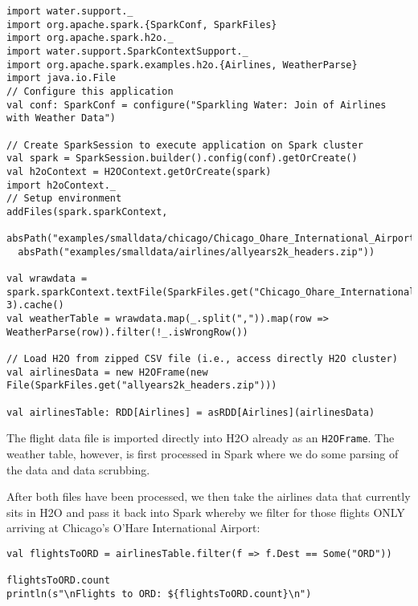 \begin{lstlisting}[style=Scala]
import water.support._
import org.apache.spark.{SparkConf, SparkFiles}
import org.apache.spark.h2o._
import water.support.SparkContextSupport._
import org.apache.spark.examples.h2o.{Airlines, WeatherParse}
import java.io.File
// Configure this application
val conf: SparkConf = configure("Sparkling Water: Join of Airlines with Weather Data")

// Create SparkSession to execute application on Spark cluster
val spark = SparkSession.builder().config(conf).getOrCreate()
val h2oContext = H2OContext.getOrCreate(spark)
import h2oContext._
// Setup environment
addFiles(spark.sparkContext,
  absPath("examples/smalldata/chicago/Chicago_Ohare_International_Airport.csv"),
  absPath("examples/smalldata/airlines/allyears2k_headers.zip"))

val wrawdata = spark.sparkContext.textFile(SparkFiles.get("Chicago_Ohare_International_Airport.csv"), 3).cache()
val weatherTable = wrawdata.map(_.split(",")).map(row => WeatherParse(row)).filter(!_.isWrongRow())

// Load H2O from zipped CSV file (i.e., access directly H2O cluster)
val airlinesData = new H2OFrame(new File(SparkFiles.get("allyears2k_headers.zip")))

val airlinesTable: RDD[Airlines] = asRDD[Airlines](airlinesData)
\end{lstlisting}

The flight data file is imported directly into H2O already as an \texttt{H2OFrame}. The weather table, however, is first processed in Spark where we do some parsing of the data and data scrubbing.

After both files have been processed, we then take the airlines data that currently sits in H2O and pass it back into Spark whereby we filter for those flights ONLY arriving at Chicago's O'Hare International Airport:
\begin{lstlisting}[style=Scala]
val flightsToORD = airlinesTable.filter(f => f.Dest == Some("ORD"))

flightsToORD.count
println(s"\nFlights to ORD: ${flightsToORD.count}\n")
\end{lstlisting}

